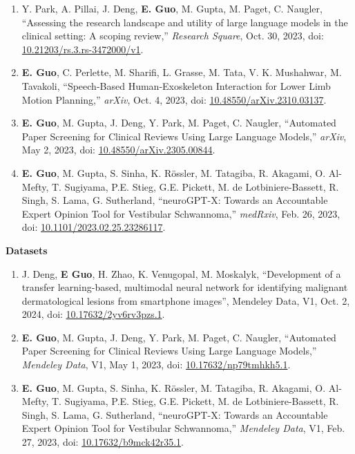 \documentclass{article}
\begin{document}
\begin{enumerate}
    \item Y. Park, A. Pillai, J. Deng, \textbf{E. Guo}, M. Gupta, M. Paget, C. Naugler, ``Assessing the research landscape and utility of large language models in the clinical setting: A scoping review,'' \textit{Research Square}, Oct. 30, 2023, doi: \href{https://doi.org/10.21203/rs.3.rs-3472000/v1}{10.21203/rs.3.rs-3472000/v1}.
    \item \textbf{E. Guo}, C. Perlette, M. Sharifi, L. Grasse, M. Tata, V. K. Mushahwar, M. Tavakoli, ``Speech-Based Human-Exoskeleton Interaction for Lower Limb Motion Planning,'' \textit{arXiv}, Oct. 4, 2023, doi: \href{https://doi.org/10.48550/arXiv.2310.03137}{10.48550/arXiv.2310.03137}.
    \item \textbf{E. Guo}, M. Gupta, J. Deng, Y. Park, M. Paget, C. Naugler, ``Automated Paper Screening for Clinical Reviews Using Large Language Models,'' \textit{arXiv}, May 2, 2023, doi: \href{https://doi.org/10.48550/arXiv.2305.00844}{10.48550/arXiv.2305.00844}.
    \item \textbf{E. Guo}, M. Gupta, S. Sinha, K. R\"ossler, M. Tatagiba, R. Akagami, O. Al-Mefty, T. Sugiyama, P.E. Stieg, G.E. Pickett, M. de Lotbiniere-Bassett, R. Singh, S. Lama, G. Sutherland, ``neuroGPT-X: Towards an Accountable Expert Opinion Tool for Vestibular Schwannoma,'' \textit{medRxiv}, Feb. 26, 2023, doi: \href{https://doi.org/10.1101/2023.02.25.23286117}{10.1101/2023.02.25.23286117}.
\end{enumerate} \vspace{1em}

\textbf{Datasets} \vspace{.5em}

\begin{enumerate}
    \item J. Deng, \textbf{E Guo}, H. Zhao, K. Venugopal, M. Moskalyk, “Development of a transfer learning-based, multimodal neural network for identifying malignant dermatological lesions from smartphone images”, Mendeley Data, V1, Oct. 2, 2024, doi: \href{https://doi.org/10.17632/2yv6rv3pzs.1}{10.17632/2yv6rv3pzs.1}.
    \item \textbf{E. Guo}, M. Gupta, J. Deng, Y. Park, M. Paget, C. Naugler, ``Automated Paper Screening for Clinical Reviews Using Large Language Models,'' \textit{Mendeley Data}, V1, May 1, 2023, doi: \href{https://doi.org/10.17632/np79tmhkh5.1}{10.17632/np79tmhkh5.1}.
    \item \textbf{E. Guo}, M. Gupta, S. Sinha, K. R\"ossler, M. Tatagiba, R. Akagami, O. Al-Mefty, T. Sugiyama, P.E. Stieg, G.E. Pickett, M. de Lotbiniere-Bassett, R. Singh, S. Lama, G. Sutherland, ``neuroGPT-X: Towards an Accountable Expert Opinion Tool for Vestibular Schwannoma,'' \textit{Mendeley Data}, V1, Feb. 27, 2023, doi: \href{https://doi.org/10.17632/b9mck42r35.1}{10.17632/b9mck42r35.1}.
\end{enumerate} \vspace{1em}
\end{document}
